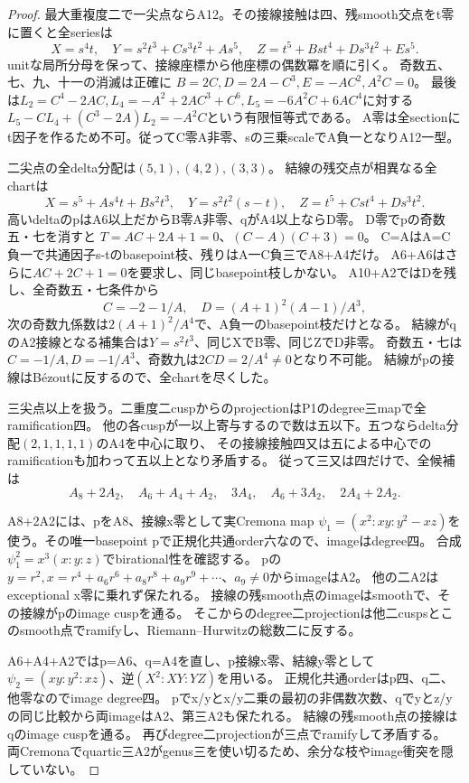 \documentclass[a4paper,11pt]{ltjsarticle}
\theoremstyle{definition}
\begin{document}
\begin{proof}
最大重複度二で一尖点ならA12。その接線接触は四、残smooth交点をt零に置くと全seriesは
\[
 X=s^4t,\quad Y=s^2t^3+Cs^3t^2+As^5,\quad
 Z=t^5+Bst^4+Ds^3t^2+Es^5.
\]
unitな局所分母を保って、接線座標から他座標の偶数冪を順に引く。
奇数五、七、九、十一の消滅は正確に
$B=2C,D=2A-C^3,E=-AC^2,A^2C=0$。
最後は$L_2=C^4-2AC,L_4=-A^2+2AC^3+C^6,L_5=-6A^2C+6AC^4$に対する
$L_5-CL_4+(C^3-2A)L_2=-A^2C$という有限恒等式である。
A零は全sectionにt因子を作るため不可。従ってC零A非零、sの三乗scaleでA負一となりA12一型。

二尖点の全delta分配は$(5,1),(4,2),(3,3)$。
結線の残交点が相異なる全chartは
\[
 X=s^5+As^4t+Bs^2t^3,\quad Y=s^2t^2(s-t),\quad Z=t^5+Cst^4+Ds^3t^2.
\]
高いdeltaのpはA6以上だからB零A非零、qがA4以上ならD零。
D零でpの奇数五・七を消すと
$T=AC+2A+1=0$、$(C-A)(C+3)=0$。
C=AはA=C負一で共通因子s-tのbasepoint枝、残りはA一C負三でA8+A4だけ。
A6+A6はさらに$AC+2C+1=0$を要求し、同じbasepoint枝しかない。
A10+A2ではDを残し、全奇数五・七条件から
\[
 C=-2-1/A,\quad D=(A+1)^2(A-1)/A^3,
\]
次の奇数九係数は$2(A+1)^2/A^4$で、A負一のbasepoint枝だけとなる。
結線がqのA2接線となる補集合は$Y=s^2t^3$、同じXでB零、同じZでD非零。
奇数五・七は$C=-1/A,D=-1/A^3$、奇数九は$2CD=2/A^4\ne0$となり不可能。
結線がpの接線はB\'ezoutに反するので、全chartを尽くした。

三尖点以上を扱う。二重度二cuspからのprojectionはP1のdegree三mapで全ramification四。
他の各cuspが一以上寄与するので数は五以下。五つならdelta分配$(2,1,1,1,1)$のA4を中心に取り、
その接線接触四又は五による中心でのramificationも加わって五以上となり矛盾する。
従って三又は四だけで、全候補は
\[
 A_8+2A_2,\quad A_6+A_4+A_2,\quad3A_4,\quad A_6+3A_2,\quad2A_4+2A_2.
\]

A8+2A2には、pをA8、接線x零として実Cremona map
$\psi_1=(x^2:xy:y^2-xz)$を使う。その唯一basepoint pで正規化共通order六なので、imageはdegree四。
合成$\psi_1^2=x^3(x:y:z)$でbirational性を確認する。
pの$y=r^2,x=r^4+a_6r^6+a_8r^8+a_9r^9+\cdots$、$a_9\ne0$からimageはA2。
他の二A2はexceptional x零に乗れず保たれる。
接線の残smooth点のimageはsmoothで、その接線がpのimage cuspを通る。
そこからのdegree二projectionは他二cuspsとこのsmooth点でramifyし、Riemann--Hurwitzの総数二に反する。

A6+A4+A2ではp=A6、q=A4を直し、p接線x零、結線y零として
$\psi_2=(xy:y^2:xz)$、逆$(X^2:XY:YZ)$を用いる。
正規化共通orderはp四、q二、他零なのでimage degree四。
pでx/yとx/y二乗の最初の非偶数次数、qでyとz/yの同じ比較から両imageはA2、第三A2も保たれる。
結線の残smooth点の接線はqのimage cuspを通る。
再びdegree二projectionが三点でramifyして矛盾する。
両Cremonaでquartic三A2がgenus三を使い切るため、余分な枝やimage衝突を隠していない。


\end{proof}
\end{document}
